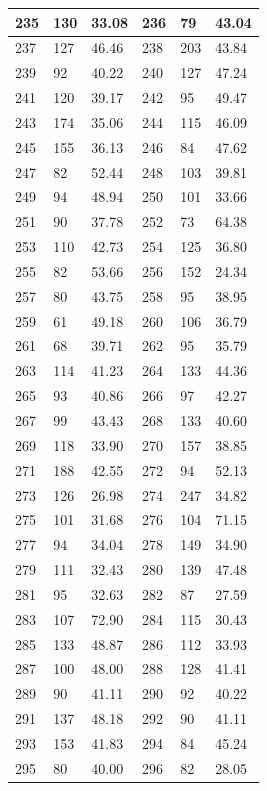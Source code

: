 \documentclass[10.9pt]{article} %
\begin{document}
{\begin{longtable}{|p{2cm}|p{2cm}|p{2cm}|p{2cm}|p{2cm}|p{2cm}|}
\hline
235 & 130& 33.08 & 236 & 79& 43.04\\
\hline
237 & 127& 46.46 & 238 & 203& 43.84\\
\hline
239 & 92& 40.22 & 240 & 127& 47.24\\
\hline
241 & 120& 39.17 & 242 & 95& 49.47\\
\hline
243 & 174& 35.06 & 244 & 115& 46.09\\
\hline
245 & 155& 36.13 & 246 & 84& 47.62\\
\hline
247 & 82& 52.44 & 248 & 103& 39.81\\
\hline
249 & 94& 48.94 & 250 & 101& 33.66\\
\hline
251 & 90& 37.78 & 252 & 73& 64.38\\
\hline
253 & 110& 42.73 & 254 & 125& 36.80\\
\hline
255 & 82& 53.66 & 256 & 152& 24.34\\
\hline
257 & 80& 43.75 & 258 & 95& 38.95\\
\hline
259 & 61& 49.18 & 260 & 106& 36.79\\
\hline
261 & 68& 39.71 & 262 & 95& 35.79\\
\hline
263 & 114& 41.23 & 264 & 133& 44.36\\
\hline
265 & 93& 40.86 & 266 & 97& 42.27\\
\hline
267 & 99& 43.43 & 268 & 133& 40.60\\
\hline
269 & 118& 33.90 & 270 & 157& 38.85\\
\hline
271 & 188& 42.55 & 272 & 94& 52.13\\
\hline
273 & 126& 26.98 & 274 & 247& 34.82\\
\hline
275 & 101& 31.68 & 276 & 104& 71.15\\
\hline
277 & 94& 34.04 & 278 & 149& 34.90\\
\hline
279 & 111& 32.43 & 280 & 139& 47.48\\
\hline
281 & 95& 32.63 & 282 & 87& 27.59\\
\hline
283 & 107& 72.90 & 284 & 115& 30.43\\
\hline
285 & 133& 48.87 & 286 & 112& 33.93\\
\hline
287 & 100& 48.00 & 288 & 128& 41.41\\
\hline
289 & 90& 41.11 & 290 & 92& 40.22\\
\hline
291 & 137& 48.18 & 292 & 90& 41.11\\
\hline
293 & 153& 41.83 & 294 & 84& 45.24\\
\hline
295 & 80& 40.00 & 296 & 82& 28.05\\

\end{longtable}}
\end{document}
